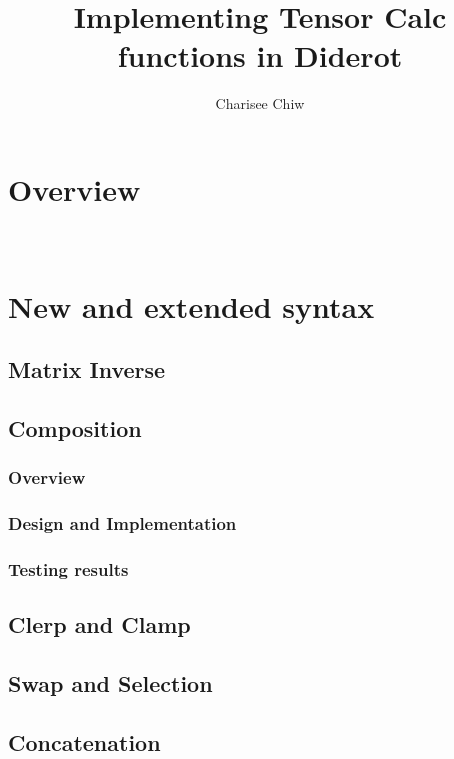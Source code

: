 \documentclass{article}
\title{Implementing Tensor Calc functions in Diderot}
\author{Charisee Chiw}
\begin{document}
\maketitle 
\section{Overview}
\\

\section{New and extended syntax}
\subsection{{\color{blue} Matrix Inverse}}



\subsection{{\color{blue} Composition}}
\subsubsection{Overview}

\subsubsection{Design and Implementation}

\subsubsection{Testing results}


\subsection{{\color{blue} Clerp and Clamp}}


\subsection{{\color{blue} Swap and Selection}}


\subsection{{\color{blue} Concatenation}}
\end{document}
